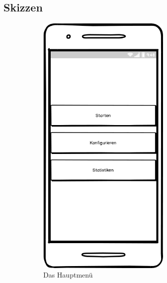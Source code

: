 \subsection{Skizzen}
\begin{figure}[htbp]
\begin{subfigure}{.33\textwidth}
  \centering
  \includegraphics[width=0.7\textwidth]{img/mainmenu}
  \caption{Das Hauptmenü}
  \label{menu}
\end{subfigure}
\begin{subfigure}{.33\textwidth}
  \centering

\end{subfigure}
\end{figure}
